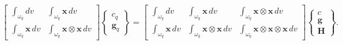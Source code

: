 \documentclass[11pt]{article} %
\begin{document}
\begin{eqnarray}
	\left[ \begin{array}{cc} \int_{\omega_q} dv & \int_{\omega_q} \mathbf{x} \, dv \\ \int_{\omega_q} \mathbf{x} \, dv & \int_{\omega_q} \mathbf{x} \otimes \mathbf{x} \, dv \end{array} \right] \left\{ \begin{array}{c} c_q \\ \mathbf{g}_q \end{array} \right\} =  \left[ \begin{array}{ccc} \int_{\omega_q} dv & \int_{\omega_q} \mathbf{x} \, dv & \int_{\omega_q} \mathbf{x} \otimes \mathbf{x} \, dv \\ \int_{\omega_q} \mathbf{x} \, dv & \int_{\omega_q} \mathbf{x} \otimes \mathbf{x} \, dv & \int_{\omega_q} \mathbf{x} \otimes \mathbf{x} \otimes \mathbf{x} \, dv \end{array} \right] \left\{ \begin{array}{c} c \\ \mathbf{g} \\ \mathbf{H} \end{array} \right\} .
\end{eqnarray}
\end{document}
